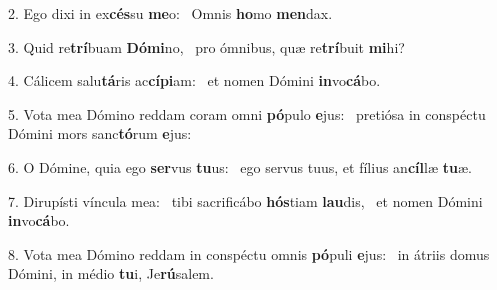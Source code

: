 2. Ego dixi in ex\textbf{cés}su \textbf{me}o: \ast\  Omnis \textbf{ho}mo \textbf{men}dax.\

3. Quid re\textbf{trí}buam \textbf{Dó}\textbf{mi}no, \ast\  pro ómnibus, quæ re\textbf{trí}buit \textbf{mi}hi?\

4. Cálicem salu\textbf{tá}ris ac\textbf{cí}\textbf{pi}am: \ast\  et nomen Dómini \textbf{in}vo\textbf{cá}bo.\

5. Vota mea Dómino reddam coram omni \textbf{pó}pulo \textbf{e}jus: \ast\  pretiósa in conspéctu Dómini mors sanc\textbf{tó}rum \textbf{e}jus:\

6. O Dómine, quia ego \textbf{ser}vus \textbf{tu}us: \ast\  ego servus tuus, et fílius an\textbf{cíl}læ \textbf{tu}æ.\

7. Dirupísti víncula mea: \dag\  tibi sacrificábo \textbf{hós}tiam \textbf{lau}dis, \ast\  et nomen Dómini \textbf{in}vo\textbf{cá}bo.\

8. Vota mea Dómino reddam in conspéctu omnis \textbf{pó}puli \textbf{e}jus: \ast\  in átriis domus Dómini, in médio \textbf{tu}i, Je\textbf{rú}salem.\

